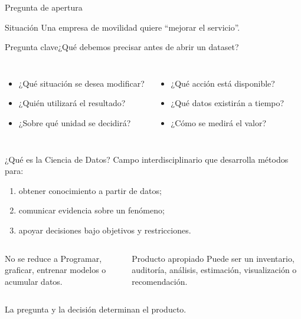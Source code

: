 \documentclass[aspectratio=169,11pt]{beamer}
\newcommand{\pregunta}[1]{\begin{block}{Pregunta clave}#1\end{block}}
\begin{document}
\begin{frame}{Pregunta de apertura}
  \begin{block}{Situación}
    Una empresa de movilidad quiere ``mejorar el servicio''.
  \end{block}
  \pregunta{¿Qué debemos precisar antes de abrir un dataset?}
  \begin{columns}[T]
      \begin{itemize}
        \item ¿Qué situación se desea modificar?
        \item ¿Quién utilizará el resultado?
        \item ¿Sobre qué unidad se decidirá?
      \end{itemize}
      \begin{itemize}
        \item ¿Qué acción está disponible?
        \item ¿Qué datos existirán a tiempo?
        \item ¿Cómo se medirá el valor?
      \end{itemize}
  \end{columns}
\end{frame}

\begin{frame}{¿Qué es la Ciencia de Datos?}
  Campo interdisciplinario que desarrolla métodos para:
  \begin{enumerate}
    \item obtener conocimiento a partir de datos;
    \item comunicar evidencia sobre un fenómeno;
    \item apoyar decisiones bajo objetivos y restricciones.
  \end{enumerate}
  \begin{columns}[T]
      \begin{block}{No se reduce a}
        Programar, graficar, entrenar modelos o acumular datos.
      \end{block}
      \begin{block}{Producto apropiado}
        Puede ser un inventario, auditoría, análisis, estimación, visualización o recomendación.
      \end{block}
  \end{columns}
  \centering\alert{La pregunta y la decisión determinan el producto.}
\end{frame}
\end{document}
